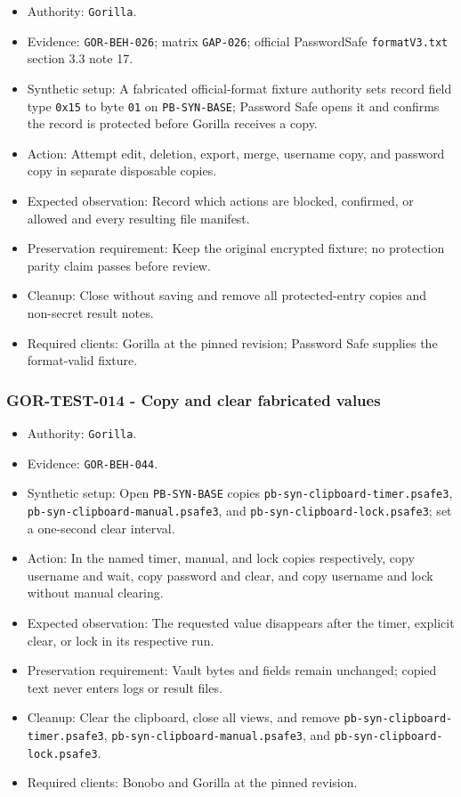 \documentclass[
  letterpaper,
]{article}
\newcommand{\passthrough}[1]{#1}
\providecommand{\tightlist}{%
  \setlength{\itemsep}{0pt}\setlength{\parskip}{0pt}}
\begin{document}
\begin{itemize}
\tightlist
\item
  Authority: \passthrough{\lstinline!Gorilla!}.
\item
  Evidence: \nolinkurl{GOR-BEH-026}; matrix \passthrough{\lstinline!GAP-026!}; official PasswordSafe
  \nolinkurl{formatV3.txt} section 3.3 note 17.
\item
  Synthetic setup: A fabricated official-format fixture authority sets record field type \passthrough{\lstinline!0x15!}
  to byte \passthrough{\lstinline!01!} on \nolinkurl{PB-SYN-BASE}; Password Safe opens it and confirms the record is
  protected before Gorilla receives a copy.
\item
  Action: Attempt edit, deletion, export, merge, username copy, and password copy in separate disposable copies.
\item
  Expected observation: Record which actions are blocked, confirmed, or allowed and every resulting file manifest.
\item
  Preservation requirement: Keep the original encrypted fixture; no protection parity claim passes before review.
\item
  Cleanup: Close without saving and remove all protected-entry copies and non-secret result notes.
\item
  Required clients: Gorilla at the pinned revision; Password Safe supplies the format-valid fixture.
\end{itemize}

\subsubsection{GOR-TEST-014 - Copy and clear fabricated values}\label{gor-test-014---copy-and-clear-fabricated-values}

\begin{itemize}
\tightlist
\item
  Authority: \passthrough{\lstinline!Gorilla!}.
\item
  Evidence: \nolinkurl{GOR-BEH-044}.
\item
  Synthetic setup: Open \nolinkurl{PB-SYN-BASE} copies \nolinkurl{pb-syn-clipboard-timer.psafe3},
  \nolinkurl{pb-syn-clipboard-manual.psafe3}, and \nolinkurl{pb-syn-clipboard-lock.psafe3}; set a one-second clear
  interval.
\item
  Action: In the named timer, manual, and lock copies respectively, copy username and wait, copy password and clear, and
  copy username and lock without manual clearing.
\item
  Expected observation: The requested value disappears after the timer, explicit clear, or lock in its respective run.
\item
  Preservation requirement: Vault bytes and fields remain unchanged; copied text never enters logs or result files.
\item
  Cleanup: Clear the clipboard, close all views, and remove \nolinkurl{pb-syn-clipboard-timer.psafe3},
  \nolinkurl{pb-syn-clipboard-manual.psafe3}, and \nolinkurl{pb-syn-clipboard-lock.psafe3}.
\item
  Required clients: Bonobo and Gorilla at the pinned revision.
\end{itemize}
\end{document}
